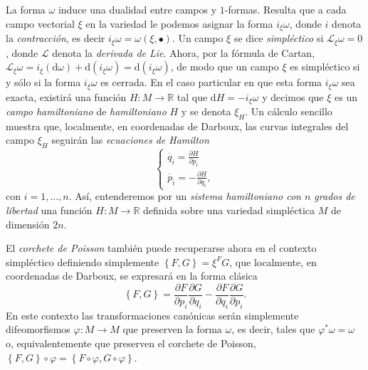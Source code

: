 \documentclass[12pt,a4paper,twoside]{article}
\theoremstyle{definition} \newtheorem{defn}[thm]{Definición}
\theoremstyle{definition} \newtheorem{ejemplo}[thm]{Ejemplo}
\theoremstyle{definition} \newtheorem{ejercicio}[thm]{Ejercicio}
\theoremstyle{remark} \newtheorem*{obs}{Observación}
\def\RR{\mathbb{R}}
\def\dd{\mathrm{d}}
\def\lie{\mathscr{L}}
\newcommand{\parcial}[2]{\frac{\partial #1}{\partial #2}}
\begin{document}
La forma $\omega$ induce una dualidad entre campos y $1$-formas. Resulta que a cada campo vectorial $\xi$ en la variedad le podemos asignar la forma $i_{\xi}\omega$, donde $i$ denota la \emph{contracción}, es decir $i_{\xi}\omega=\omega(\xi,\bullet)$. Un campo $\xi$ se dice \emph{simpléctico} si $\lie_{\xi}\omega=0$, donde $\lie$ denota la \emph{derivada de Lie}. Ahora, por la fórmula de Cartan, $\lie_{\xi}\omega=i_{\xi}(\dd \omega)+\dd(i_{\xi}\omega)=\dd(i_{\xi}\omega)$, de modo que un campo $\xi$ es simpléctico si y sólo si la forma $i_{\xi}\omega$ es cerrada. En el caso particular en que esta forma $i_{\xi}\omega$ sea exacta, existirá una función $H:M\rightarrow \RR$ tal que $\dd H=-i_{\xi}\omega$ y decimos que $\xi$ es un \emph{campo hamiltoniano} de \emph{hamiltoniano} $H$ y se denota $\xi_H$. Un cálculo sencillo muestra que, localmente, en coordenadas de Darboux, las curvas integrales del campo $\xi_H$ seguirán las \emph{ecuaciones de Hamilton}
\begin{equation}
  \begin{cases}
    \dot{q_i}=\parcial{H}{p_i}\\ 
    \dot{p_i}=-\parcial{H}{q_i} ,
  \end{cases}
  \label{eq:hamilton}
\end{equation}
con $i=1,\dots,n$.
Así, entenderemos por un \emph{sistema hamiltoniano con $n$ grados de libertad} una función $H:M\rightarrow \RR$ definida sobre una variedad simpléctica $M$ de dimensión $2n$.

El  \emph{corchete de Poisson} también puede recuperarse ahora en el contexto simpléctico definiendo simplemente $\left\{ F,G \right\}=\xi^F G$, que localmente, en coordenadas de Darboux, se expresará en la forma clásica
\begin{equation}
  \left\{ F,G \right\}=\parcial{F}{p_i}\parcial{G}{q_i}-\parcial{F}{q_i}\parcial{G}{p_i}.
  \label{eq:poisson}
\end{equation}
En este contexto las transformaciones canónicas serán simplemente difeomorfismos $\varphi:M\rightarrow M$ que preserven la forma $\omega$, es decir, tales que $\varphi^*\omega=\omega$ o, equivalentemente que preserven el corchete de Poisson, $\left\{ F,G \right\}\circ \varphi=\left\{ F\circ \varphi,G\circ \varphi \right\}$.
\end{document}
